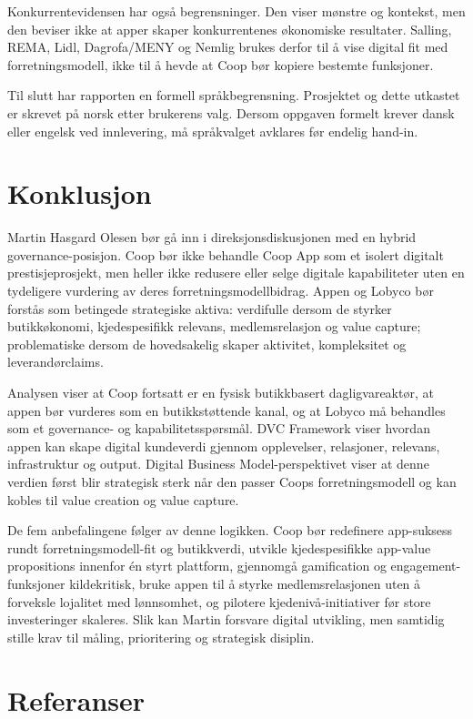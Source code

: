 \documentclass[12pt,a4paper]{article}
\begin{document}
Konkurrentevidensen har også begrensninger. Den viser mønstre og kontekst, men den beviser ikke at apper skaper konkurrentenes økonomiske resultater. Salling, REMA, Lidl, Dagrofa/MENY og Nemlig brukes derfor til å vise digital fit med forretningsmodell, ikke til å hevde at Coop bør kopiere bestemte funksjoner.

Til slutt har rapporten en formell språkbegrensning. Prosjektet og dette utkastet er skrevet på norsk etter brukerens valg. Dersom oppgaven formelt krever dansk eller engelsk ved innlevering, må språkvalget avklares før endelig hand-in.

\section{Konklusjon}

Martin Hasgard Olesen bør gå inn i direksjonsdiskusjonen med en hybrid governance-posisjon. Coop bør ikke behandle Coop App som et isolert digitalt prestisjeprosjekt, men heller ikke redusere eller selge digitale kapabiliteter uten en tydeligere vurdering av deres forretningsmodellbidrag. Appen og Lobyco bør forstås som betingede strategiske aktiva: verdifulle dersom de styrker butikkøkonomi, kjedespesifikk relevans, medlemsrelasjon og value capture; problematiske dersom de hovedsakelig skaper aktivitet, kompleksitet og leverandørclaims.

Analysen viser at Coop fortsatt er en fysisk butikkbasert dagligvareaktør, at appen bør vurderes som en butikkstøttende kanal, og at Lobyco må behandles som et governance- og kapabilitetsspørsmål. DVC Framework viser hvordan appen kan skape digital kundeverdi gjennom opplevelser, relasjoner, relevans, infrastruktur og output. Digital Business Model-perspektivet viser at denne verdien først blir strategisk sterk når den passer Coops forretningsmodell og kan kobles til value creation og value capture.

De fem anbefalingene følger av denne logikken. Coop bør redefinere app-suksess rundt forretningsmodell-fit og butikkverdi, utvikle kjedespesifikke app-value propositions innenfor én styrt plattform, gjennomgå gamification og engagement-funksjoner kildekritisk, bruke appen til å styrke medlemsrelasjonen uten å forveksle lojalitet med lønnsomhet, og pilotere kjedenivå-initiativer før store investeringer skaleres. Slik kan Martin forsvare digital utvikling, men samtidig stille krav til måling, prioritering og strategisk disiplin.

\section{Referanser}
\end{document}
